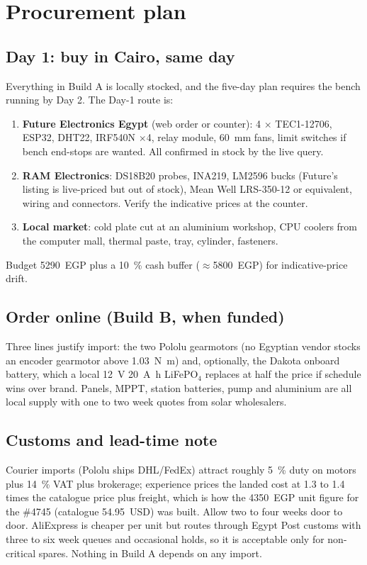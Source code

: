 \documentclass[11pt,a4paper]{article}
\begin{document}
\section{Procurement plan}
\label{sec:procurement}

\subsection{Day 1: buy in Cairo, same day}
Everything in Build A is locally stocked, and the five-day plan requires
the bench running by Day 2. The Day-1 route is:

\begin{enumerate}[nosep]
  \item \textbf{Future Electronics Egypt} (web order or counter): 4
        $\times$ TEC1-12706, ESP32, DHT22, IRF540N $\times$4, relay
        module, \SI{60}{\milli\metre} fans, limit switches if bench
        end-stops are wanted. All confirmed in stock by the live query.
  \item \textbf{RAM Electronics}: DS18B20 probes, INA219, LM2596 bucks
        (Future's listing is live-priced but out of stock), Mean Well
        LRS-350-12 or equivalent, wiring and connectors. Verify the
        indicative prices at the counter.
  \item \textbf{Local market}: cold plate cut at an aluminium workshop,
        CPU coolers from the computer mall, thermal paste, tray, cylinder,
        fasteners.
\end{enumerate}

Budget \num{5290}~EGP plus a \SI{10}{\percent} cash buffer
($\approx$\num{5800}~EGP) for indicative-price drift.

\subsection{Order online (Build B, when funded)}
Three lines justify import: the two Pololu gearmotors (no Egyptian vendor
stocks an encoder gearmotor above \SI{1.03}{\newton\metre}) and, optionally,
the Dakota onboard battery, which a local \SI{12}{\volt}
\SI{20}{\ampere\hour} LiFePO$_4$ replaces at half the price if schedule
wins over brand. Panels, MPPT, station batteries, pump and aluminium are
all local supply with one to two week quotes from solar wholesalers.

\subsection{Customs and lead-time note}
Courier imports (Pololu ships DHL/FedEx) attract roughly \SI{5}{\percent}
duty on motors plus \SI{14}{\percent} VAT plus brokerage; experience prices
the landed cost at \num{1.3} to \num{1.4} times the catalogue price plus
freight, which is how the \num{4350}~EGP unit figure for the \#4745
(catalogue 54.95~USD) was built. Allow two to four weeks door to door.
AliExpress is cheaper per unit but routes through Egypt Post customs with
three to six week queues and occasional holds, so it is acceptable only for
non-critical spares. Nothing in Build A depends on any import.
\end{document}
